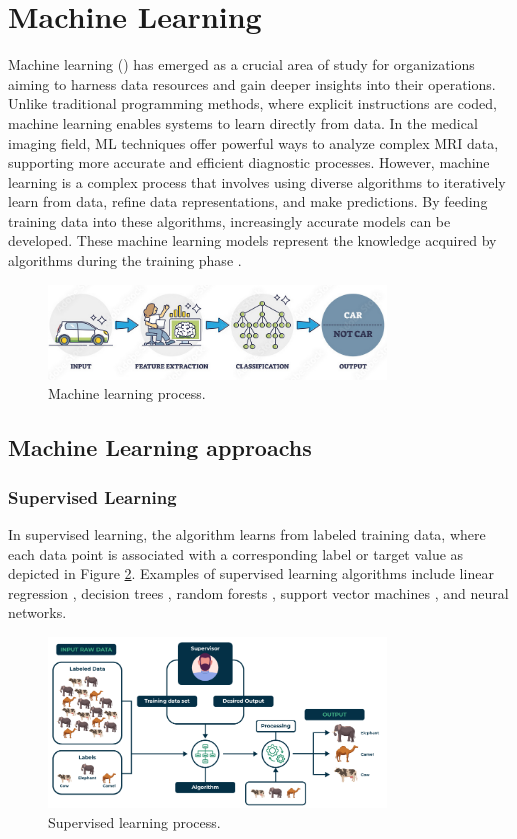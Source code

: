 \section{Machine Learning}
\label{sec:ml}
Machine learning () has emerged as a crucial area of study for organizations aiming to harness data resources and gain deeper insights into their operations. Unlike traditional programming methods, where explicit instructions are coded, machine learning enables systems to learn directly from data. In the medical imaging field, ML techniques offer powerful ways to analyze complex MRI data, supporting more accurate and efficient diagnostic processes. However, machine learning is a complex process that involves using diverse algorithms to iteratively learn from data, refine data representations, and make predictions. By feeding training data into these algorithms, increasingly accurate models can be developed. These machine learning models represent the knowledge acquired by algorithms during the training phase \cite{hurwitz2018mlfd}.

\begin{figure}[H]
  \centering
  \includegraphics[width=0.8\textwidth]{Images/Chapter1/ml.png}
  \caption{Machine learning process.}
  \label{fig:ml}
\end{figure}
\subsection{Machine Learning approachs}
\subsubsection{Supervised Learning}
In supervised learning, the algorithm learns from labeled training data, where each data point is associated with a corresponding label or target value as depicted in Figure \ref{fig:superml}. Examples of supervised learning algorithms include linear regression , decision trees , random forests , support vector machines , and neural networks.

\begin{figure}[H]
  \centering
  \includegraphics[width=0.8\textwidth]{Images/Chapter1/superml.png}
  \caption{Supervised learning process.}
  \label{fig:superml}
\end{figure}


